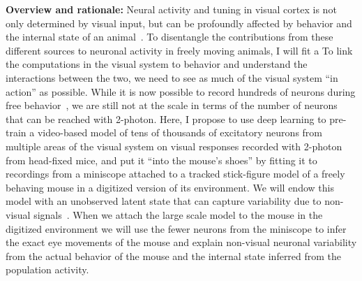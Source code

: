 \documentclass[B2,COG]{ercgrant}
\begin{document}
\textbf{Overview and rationale:} Neural activity and tuning in visual cortex is not only determined by visual input, but can be profoundly affected by behavior and the internal state of an animal~\parencite{Niell2010-bs,Musall2019-kd,Stringer2019-lt, Franke2022-do}.
To disentangle the contributions from these different sources to neuronal activity in freely moving animals, I will fit a 
To link the computations in the visual system to behavior and understand the interactions between the two, we need to see as much of the visual system ``in action'' as possible. 
While it is now possible to record hundreds of neurons during free behavior~\parencite{Parker2022-ac}, we are still not at the scale in terms of the number of neurons that can be reached with 2-photon. 
Here, I propose to use deep learning to pre-train a video-based model of tens of thousands of excitatory neurons from multiple areas of the visual system on visual responses recorded with 2-photon from head-fixed mice, and put it ``into the mouse's shoes'' by fitting it to recordings from a miniscope attached to a tracked stick-figure model of a freely behaving mouse in a  digitized version of its environment.
We will endow this model with an unobserved latent state that can capture variability due to non-visual signals~\parencite{Musall2019-kd, Bashiri2021-or}.
When we attach the large scale model to the mouse in the digitized environment we will use the fewer neurons from the miniscope to infer the exact eye movements of the mouse and explain non-visual neuronal variability from the actual behavior of the mouse and the internal state inferred from the population activity.
\end{document}
